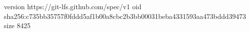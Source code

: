 version https://git-lfs.github.com/spec/v1
oid sha256:c735bb35757f0fddd5af1b00a8cbc2b3bb00031beba4331593aa473bddd39473
size 8425
